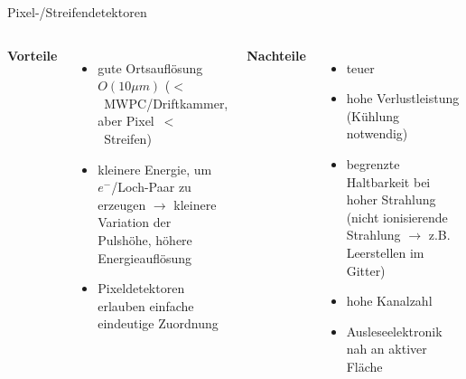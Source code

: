 \begin{frame}{Pixel-/Streifendetektoren}
    \begin{columns}[T]
			\textbf{Vorteile}		
			\begin{itemize}
			  \item gute Ortsauflösung $O(10\mu m)$  ($<$~MWPC/Driftkammer, aber Pixel~$<$~Streifen)
			  \item kleinere Energie, um $e^-$/Loch-Paar zu erzeugen $\rightarrow$ kleinere Variation der
			  Pulshöhe, höhere Energieauflösung
			  \item Pixeldetektoren erlauben einfache eindeutige Zuordnung
			\end{itemize}	
	    	\textbf{Nachteile}
	    	\begin{itemize}
			  \item teuer
			  \item hohe Verlustleistung (Kühlung notwendig)
			  \item begrenzte Haltbarkeit bei hoher Strahlung (nicht ionisierende Strahlung $\rightarrow$
			  z.B. Leerstellen im Gitter)
			  \item hohe Kanalzahl
			  \item Ausleseelektronik nah an aktiver Fläche
			\end{itemize}
    \end{columns}
   \end{frame}
   
